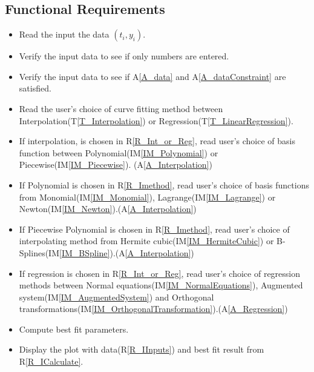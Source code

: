 \documentclass[12pt]{article}
\newcommand{\tref}[1]{T\ref{#1}}
\newcommand{\aref}[1]{A\ref{#1}}
\newcommand{\iref}[1]{IM\ref{#1}}
\newcounter{reqnum} %
\newcommand{\rref}[1]{R\ref{#1}}
\begin{document}
\subsection{Functional Requirements}

\begin{itemize}
\item[R\refstepcounter{reqnum}\thereqnum \label{R_IInputs}:] Read the input the data $(t_i,y_i)$.

\item[R\refstepcounter{reqnum}\thereqnum \label{R_IverifyIPType}:]Verify the input data to see if only numbers are entered.

\item[R\refstepcounter{reqnum}\thereqnum \label{R_IverifyIPData}:]Verify the input data to see if \aref{A_data} and \aref{A_dataConstraint} are satisfied.

\item[R\refstepcounter{reqnum}\thereqnum \label{R_Int_or_Reg}:]Read the user's choice of curve fitting method between Interpolation(\tref{T_Interpolation}) or Regression(\tref{T_LinearRegression}).

\item[R\refstepcounter{reqnum}\thereqnum \label{R_Imethod}:]If interpolation, is chosen in \rref{R_Int_or_Reg}, read user's choice of basis function between Polynomial(\iref{IM_Polynomial}) or Piecewise(\iref{IM_Piecewise}). (\aref{A_Interpolation})

\item[R\refstepcounter{reqnum}\thereqnum \label{R_Polynomialmethod}:]If Polynomial is chosen in \rref{R_Imethod}, read user's choice of basis functions from Monomial(\iref{IM_Monomial}), Lagrange(\iref{IM_Lagrange}) or Newton(\iref{IM_Newton}).(\aref{A_Interpolation})

\item[R\refstepcounter{reqnum}\thereqnum \label{R_Piecewisemethod}:]If Piecewise Polynomial is chosen in \rref{R_Imethod}, read user's choice of interpolating method from Hermite cubic(\iref{IM_HermiteCubic}) or B-Splines(\iref{IM_BSpline}).(\aref{A_Interpolation})

\item[R\refstepcounter{reqnum}\thereqnum \label{R_Rmethod}:]If regression is chosen in \rref{R_Int_or_Reg}, read user's choice of regression methods between Normal equations(\iref{IM_NormalEquations}), Augmented system(\iref{IM_AugmentedSystem}) and Orthogonal transformations(\iref{IM_OrthogonalTransformation}).(\aref{A_Regression})

\item[R\refstepcounter{reqnum}\thereqnum \label{R_ICalculate}:] Compute best fit parameters.

\item[R\refstepcounter{reqnum}\thereqnum \label{R_IOutput}:] Display the plot with data(\rref{R_IInputs}) and best fit result from \rref{R_ICalculate}.

\end{itemize}
\end{document}

